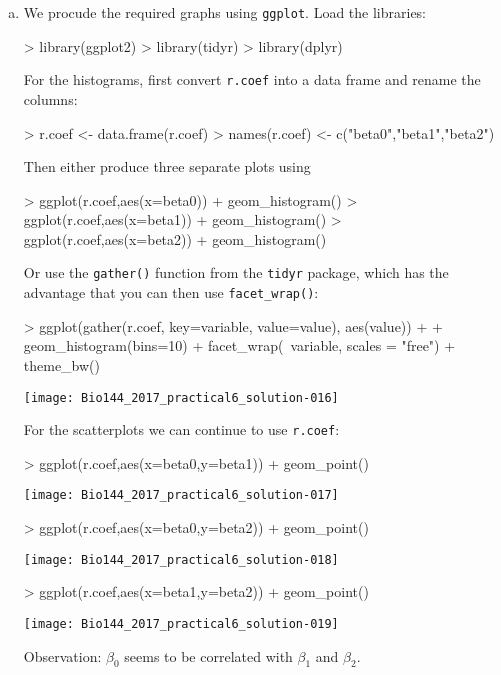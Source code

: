 \documentclass[a4paper,12pt]{scrartcl}
\begin{document}
\begin{enumerate}[a)]
\item We procude the required graphs using \texttt{ggplot}. Load the libraries:
\begin{Schunk}
\begin{Sinput}
> library(ggplot2)
> library(tidyr)
> library(dplyr)
\end{Sinput}
\end{Schunk}

For the histograms, first convert \texttt{r.coef} into a data frame and rename the columns:
\begin{Schunk}
\begin{Sinput}
> r.coef <- data.frame(r.coef)
> names(r.coef) <- c("beta0","beta1","beta2")
\end{Sinput}
\end{Schunk}
Then either produce three separate plots using
\begin{Schunk}
\begin{Sinput}
> ggplot(r.coef,aes(x=beta0)) + geom_histogram()
> ggplot(r.coef,aes(x=beta1)) + geom_histogram()
> ggplot(r.coef,aes(x=beta2)) + geom_histogram()
\end{Sinput}
\end{Schunk}

Or use the \texttt{gather()} function from the \texttt{tidyr} package, which has the advantage that you can then use \texttt{facet\_wrap()}:
\begin{Schunk}
\begin{Sinput}
> ggplot(gather(r.coef, key=variable, value=value), aes(value)) +
+   geom_histogram(bins=10) + facet_wrap(~variable, scales = "free") + theme_bw()
\end{Sinput}
\end{Schunk}
\texttt{[image: Bio144\_2017\_practical6\_solution-016]}




% 
For the scatterplots we can continue to use \texttt{r.coef}:

\begin{Schunk}
\begin{Sinput}
> ggplot(r.coef,aes(x=beta0,y=beta1)) + geom_point()  
\end{Sinput}
\end{Schunk}
\texttt{[image: Bio144\_2017\_practical6\_solution-017]}
\begin{Schunk}
\begin{Sinput}
> ggplot(r.coef,aes(x=beta0,y=beta2)) + geom_point()
\end{Sinput}
\end{Schunk}
\texttt{[image: Bio144\_2017\_practical6\_solution-018]}
\begin{Schunk}
\begin{Sinput}
> ggplot(r.coef,aes(x=beta1,y=beta2)) + geom_point()
\end{Sinput}
\end{Schunk}
\texttt{[image: Bio144\_2017\_practical6\_solution-019]}

Observation:  $\beta_0$ seems to be correlated with $\beta_1$ and $\beta_2$.

\end{enumerate}
\end{document}
